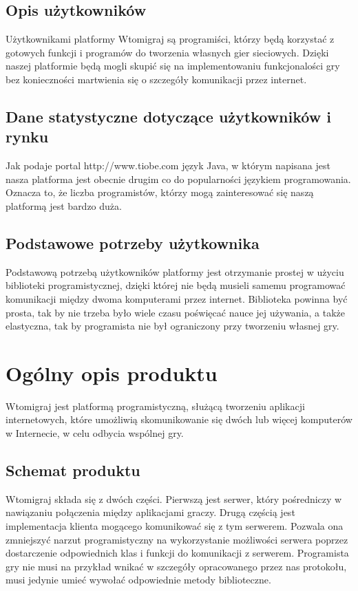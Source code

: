 \documentclass[a4paper, 12pt]{article}
\begin{document}
\subsection[Opis użytkowników]{Opis użytkowników}
Użytkownikami platformy Wtomigraj są programiści, którzy będą korzystać z gotowych funkcji i programów do tworzenia własnych gier sieciowych. Dzięki naszej platformie będą mogli skupić się na implementowaniu funkcjonalości gry bez konieczności martwienia się o szczegóły komunikacji przez internet. 

\subsection[Dane statystyczne dot. użytkowników i rynku]{Dane statystyczne dotyczące użytkowników i rynku}
Jak podaje portal http://www.tiobe.com język Java, w którym napisana jest nasza platforma jest obecnie drugim co do popularności językiem programowania. Oznacza to, że liczba programistów, którzy mogą zainteresować się naszą platformą jest bardzo duża.

\subsection[Podstawowe potrzeby użytkownika]{Podstawowe potrzeby użytkownika}
Podstawową potrzebą użytkowników platformy jest otrzymanie prostej w użyciu biblioteki programistycznej, dzięki której nie będą musieli samemu programować komunikacji między dwoma komputerami przez internet. Biblioteka powinna być prosta, tak by nie trzeba było wiele czasu poświęcać nauce jej używania, a także elastyczna, tak by programista nie był ograniczony przy tworzeniu własnej gry.

\section[Ogólny opis produktu]{Ogólny opis produktu}
Wtomigraj jest platformą programistyczną, służącą tworzeniu aplikacji internetowych, które umożliwią skomunikowanie się dwóch lub więcej komputerów w Internecie, w celu odbycia wspólnej gry.

\subsection[Schemat produktu]{Schemat produktu}
Wtomigraj składa się z dwóch części. Pierwszą jest serwer, który pośredniczy w nawiązaniu połączenia między aplikacjami graczy. Drugą częścią jest implementacja klienta mogącego komunikować się z tym serwerem. Pozwala ona zmniejszyć narzut programistyczny na wykorzystanie możliwości serwera poprzez dostarczenie odpowiednich klas i funkcji do komunikacji z serwerem. Programista gry nie musi na przykład wnikać w szczegóły opracowanego przez nas protokołu, musi jedynie umieć wywołać odpowiednie metody biblioteczne. 
\end{document}
